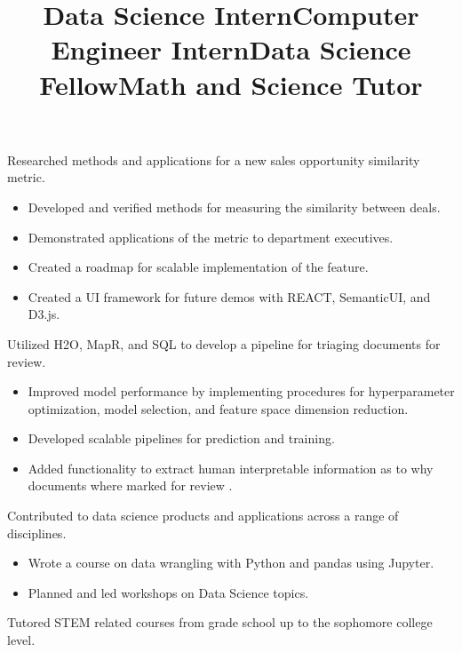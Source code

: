 \documentclass[margin]{res}
\begin{document}
\begin{resume}
\title{\textbf{Data Science Intern}}
\begin{position}
Researched methods and applications for a new sales opportunity similarity metric.
\begin{itemize}
\item Developed and verified methods for measuring the similarity between deals.
\item Demonstrated applications of the metric to department executives.
\item Created a roadmap for scalable implementation of the feature.
\item Created a UI framework for future demos with REACT, SemanticUI, and D3.js.
\end{itemize}
\end{position}

\title{\textbf{Computer Engineer Intern}}
\begin{position}
Utilized H2O, MapR, and SQL to develop a pipeline for triaging documents for review. 
\begin{itemize}
\item Improved model performance by implementing procedures for hyperparameter optimization, model selection, and feature space dimension reduction.
\item Developed scalable pipelines for prediction and training.
\item Added functionality to extract human interpretable information as to why documents where marked for review . 
\end{itemize}
\end{position}

\title{\textbf{Data Science Fellow}}
\begin{position}
Contributed to data science products and applications across a range of disciplines.
\begin{itemize}
\item Wrote a course on data wrangling with Python and pandas using Jupyter. 
\item Planned and led workshops on Data Science topics.
\end{itemize}
\end{position}

\title{\textbf{Math and Science Tutor}}
\begin{position}
Tutored STEM related courses from grade school up to the sophomore college level.
\end{position}


\end{resume}
\end{document}
